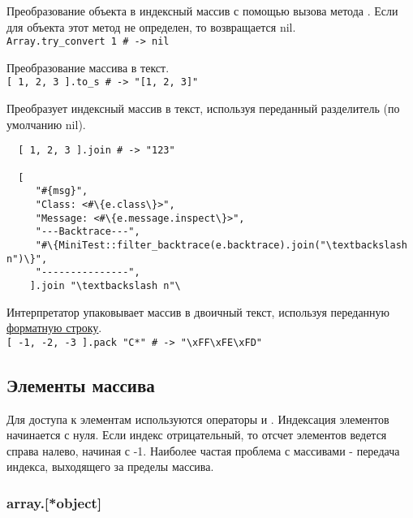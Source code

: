 \begin{methodlist}
  Преобразование объекта в индексный массив с помощью вызова метода . Если для объекта этот метод не определен, то возвращается nil. 
  \\\verb!Array.try_convert 1 # -> nil!

  Преобразование массива в текст. 
  \\\verb![ 1, 2, 3 ].to_s # -> "[1, 2, 3]"!


  Преобразует индексный массив в текст, используя переданный разделитель (по умолчанию nil).
  \begin{verbatim}
  [ 1, 2, 3 ].join # -> "123"

  [
     "#{msg}",
     "Class: <#\{e.class\}>",
     "Message: <#\{e.message.inspect\}>",
     "---Backtrace---",
     "#\{MiniTest::filter_backtrace(e.backtrace).join("\textbackslash n")\}",
     "---------------",
    ].join "\textbackslash n"\
  \end{verbatim}  

  Интерпретатор упаковывает массив в двоичный текст, используя переданную \hyperlink{apppack}{\underline{форматную строку}}.
  \\\verb![ -1, -2, -3 ].pack "C*" # -> "\xFF\xFE\xFD"!
\end{methodlist}

\subsection*{Элементы массива}

Для доступа к элементам используются операторы \method{[]} и \method{[]=}. Индексация элементов начинается с нуля. Если индекс отрицательный, то отсчет элементов ведется справа налево, начиная с -1. Наиболее частая проблема с массивами - передача индекса, выходящего за пределы массива.

\subsubsection*{array.[*object]} 


